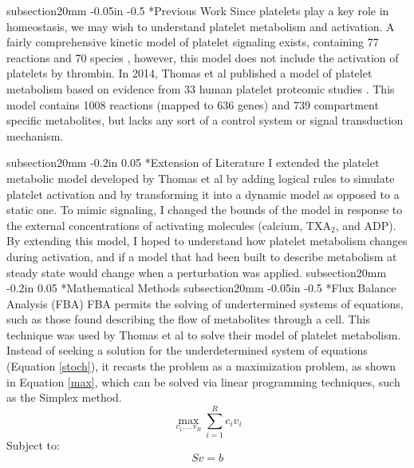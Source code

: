 \documentclass[11pt]{article}
\makeatletter
\renewcommand\subsection{\@startsection
	{subsection}{2}{0mm}
	{-0.05in}
	{-0.5\baselineskip}
	{\normalfont\normalsize\bfseries}}
\renewcommand\section{\@startsection
	{subsection}{2}{0mm}
	{-0.2in}
	{0.05\baselineskip}
	{\normalfont\large\bfseries}}
\makeatother
\begin{document}
\subsection*{Previous Work}
Since platelets play a key role in homeostasis, we may wish to understand platelet metabolism and activation. A fairly comprehensive kinetic model of platelet signaling exists, containing 77 reactions and 70 species \cite{purvis2008molecular}, however, this model does not include the activation of platelets by thrombin. In 2014, Thomas et al published a model of platelet metabolism based on evidence from 33 human platelet proteomic studies \cite{thomas2014network}. This model contains 1008 reactions (mapped to 636 genes) and 739 compartment specific metabolites, but lacks any sort of a control system or signal transduction mechanism.  

\section*{Extension of Literature}
I extended the platelet metabolic model developed by Thomas et al by adding logical rules to simulate platelet activation and by transforming it into a dynamic model as opposed to a static one. To mimic signaling, I changed the bounds of the model in response to the external concentrations of activating molecules (calcium, TXA$_2$, and ADP). By extending this model, I hoped to understand how platelet metabolism changes during activation, and if a model that had been built to describe metabolism at steady state would change when a perturbation was applied. 
\section*{Mathematical Methods}
\subsection*{Flux Balance Analysis (FBA)}
FBA permits the solving of undertermined systems of equations, such as those found describing the flow of metabolites through a cell. This technique was used by Thomas et al to solve their model of platelet metabolism. Instead of seeking a solution for the underdetermined system of equations (Equation \ref{stoch}), it recasts the problem as a maximization problem, as shown in Equation \ref{max}, which can be solved via linear programming techniques, such as the Simplex method.
\begin{equation}
\max_{v_1,...v_R}\sum_{i=1}^Rc_iv_i
\label{max}
\end{equation}
Subject to:
\begin{equation}
Sv=b
\label{stoch}
\end{equation}
\end{document}
